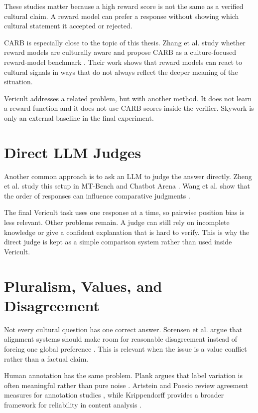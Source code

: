 These studies matter because a high reward score is not the same as a verified cultural claim. A reward model can prefer a response without showing which cultural statement it accepted or rejected.

CARB is especially close to the topic of this thesis. Zhang et al. study whether reward models are culturally aware and propose CARB as a culture-focused reward-model benchmark \parencite{zhang2025carb}. Their work shows that reward models can react to cultural signals in ways that do not always reflect the deeper meaning of the situation.

Vericult addresses a related problem, but with another method. It does not learn a reward function and it does not use CARB scores inside the verifier. Skywork is only an external baseline in the final experiment.

\section{Direct LLM Judges}

Another common approach is to ask an LLM to judge the answer directly. Zheng et al. study this setup in MT-Bench and Chatbot Arena \parencite{zheng2023judging}. Wang et al. show that the order of responses can influence comparative judgments \parencite{wang2024fair}.

The final Vericult task uses one response at a time, so pairwise position bias is less relevant. Other problems remain. A judge can still rely on incomplete knowledge or give a confident explanation that is hard to verify. This is why the direct judge is kept as a simple comparison system rather than used inside Vericult.

\section{Pluralism, Values, and Disagreement}

Not every cultural question has one correct answer. Sorensen et al. argue that alignment systems should make room for reasonable disagreement instead of forcing one global preference \parencite{sorensen2024pluralistic}. This is relevant when the issue is a value conflict rather than a factual claim.

Human annotation has the same problem. Plank argues that label variation is often meaningful rather than pure noise \parencite{plank2022labelvariation}. Artstein and Poesio review agreement measures for annotation studies \parencite{artstein2008agreement}, while Krippendorff provides a broader framework for reliability in content analysis \parencite{krippendorff2018content}.

